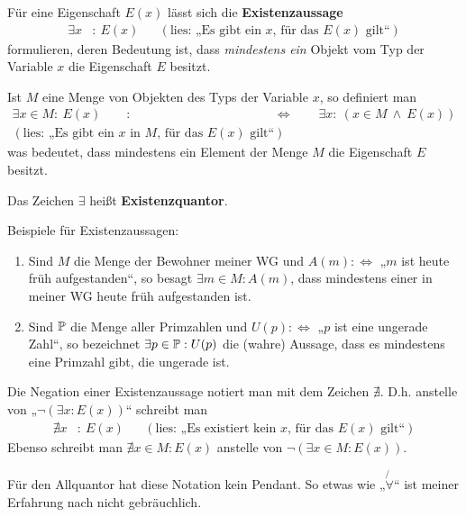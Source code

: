 \begin{de}[Existenzaussage]\label{def:existquant}
    Für eine Eigenschaft $E(x)$ lässt sich die \textbf{Existenzaussage}
    \begin{align*}
        \exists x &:\ E(x) && (\text{lies: „Es gibt ein $x$, für das $E(x)$ gilt“})
    \end{align*}
    formulieren, deren Bedeutung ist, dass \emph{mindestens ein} Objekt vom Typ der Variable $x$ die Eigenschaft $E$ besitzt.
    
    Ist $M$ eine Menge von Objekten des Typs der Variable $x$, so definiert man
    \begin{align*}
        \exists x\in M:\ E(x) \qquad :& \Leftrightarrow\qquad \exists x:\ (x\in M\ \land\ E(x))  \\
        (\text{lies: „Es gibt ein $x$ in $M$, für das $E(x)$ gilt“}) &
    \end{align*}
    was bedeutet, dass mindestens ein Element der Menge $M$ die Eigenschaft $E$ besitzt.
    
    Das Zeichen $\exists$ heißt \textbf{Existenzquantor}.
\end{de}
    

\begin{bsp}
    Beispiele für Existenzaussagen:
    \begin{enumerate}
        \item Sind $M$ die Menge der Bewohner meiner WG und $A(m):\Leftrightarrow$ „$m$ ist heute früh aufgestanden“, so besagt $\exists m\in M: A(m)$, dass mindestens einer in meiner WG heute früh aufgestanden ist.
        \item Sind $\mathbb P$ die Menge aller Primzahlen und $U(p):\Leftrightarrow$ „$p$ ist eine ungerade Zahl“, so bezeichnet $\exists p\in \mathbb P: U(p)$ die (wahre) Aussage, dass es mindestens eine Primzahl gibt, die ungerade ist.
    \end{enumerate}
\end{bsp}


\begin{nota}
    Die Negation einer Existenzaussage notiert man mit dem Zeichen $\nexists$. D.h. anstelle von „$\neg (\exists x: E(x))$“ schreibt man
    \begin{align*}
        \nexists x &:\ E(x) && (\text{lies: „Es existiert kein $x$, für das $E(x)$ gilt“})
    \end{align*}
    Ebenso schreibt man $\nexists x\in M: E(x)$ anstelle von $\neg (\exists x\in M: E(x))$.
    
    Für den Allquantor hat diese Notation kein Pendant. So etwas wie „$\not{\!\forall}$“ ist meiner Erfahrung nach nicht gebräuchlich.
\end{nota}


